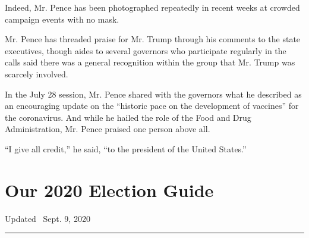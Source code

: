 Indeed, Mr. Pence has been photographed repeatedly in recent weeks at
crowded campaign events with no mask.

Mr. Pence has threaded praise for Mr. Trump through his comments to the
state executives, though aides to several governors who participate
regularly in the calls said there was a general recognition within the
group that Mr. Trump was scarcely involved.

In the July 28 session, Mr. Pence shared with the governors what he
described as an encouraging update on the ``historic pace on the
development of vaccines'' for the coronavirus. And while he hailed the
role of the Food and Drug Administration, Mr. Pence praised one person
above all.

``I give all credit,'' he said, ``to the president of the United
States.''

\hypertarget{our-2020-election-guide}{%
\section{Our 2020 Election Guide}\label{our-2020-election-guide}}

Updated ~Sept. 9, 2020

\begin{center}\rule{0.5\linewidth}{\linethickness}\end{center}

